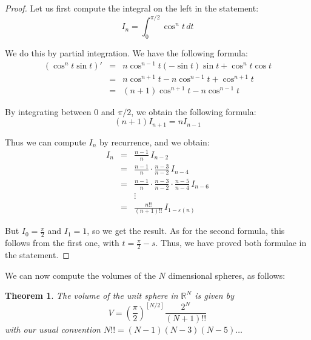 \documentclass[12pt]{amsbook}
\newtheorem{theorem}{Theorem}[chapter]
\begin{document}
\begin{proof}
Let us first compute the integral on the left in the statement:
$$I_n=\int_0^{\pi/2}\cos^nt\,dt$$

We do this by partial integration. We have the following formula:
\begin{eqnarray*}
(\cos^nt\sin t)'
&=&n\cos^{n-1}t(-\sin t)\sin t+\cos^nt\cos t\\
&=&n\cos^{n+1}t-n\cos^{n-1}t+\cos^{n+1}t\\
&=&(n+1)\cos^{n+1}t-n\cos^{n-1}t
\end{eqnarray*}

By integrating between $0$ and $\pi/2$, we obtain the following formula:
$$(n+1)I_{n+1}=nI_{n-1}$$

Thus we can compute $I_n$ by recurrence, and we obtain:
\begin{eqnarray*}
I_n
&=&\frac{n-1}{n}\,I_{n-2}\\
&=&\frac{n-1}{n}\cdot\frac{n-3}{n-2}\,I_{n-4}\\
&=&\frac{n-1}{n}\cdot\frac{n-3}{n-2}\cdot\frac{n-5}{n-4}\,I_{n-6}\\
&&\vdots\\
&=&\frac{n!!}{(n+1)!!}\,I_{1-\varepsilon(n)}
\end{eqnarray*}

But $I_0=\frac{\pi}{2}$ and $I_1=1$, so we get the result. As for the second formula, this follows from the first one, with $t=\frac{\pi}{2}-s$. Thus, we have proved both formulae in the statement.
\end{proof}

We can now compute the volumes of the $N$ dimensional spheres, as follows:


\begin{theorem}
The volume of the unit sphere in $\mathbb R^N$ is given by
$$V=\left(\frac{\pi}{2}\right)^{[N/2]}\frac{2^N}{(N+1)!!}$$
with our usual convention $N!!=(N-1)(N-3)(N-5)\ldots$
\end{theorem}
\end{document}
